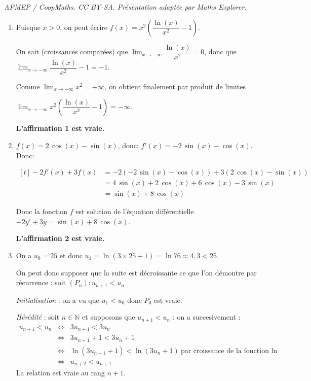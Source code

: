 \documentclass[10pt]{article}
\providecommand{\N}{\mathbb{N}}
\begin{document}
\noindent\textit{APMEP / CoopMaths. CC BY-SA. Présentation adaptée par Maths Explorer.}\par\medskip
\smallskip

\begin{enumerate}
\item Puisque $x > 0$, on peut écrire $f(x) = x^2\left(\dfrac{\ln (x)}{x^2}  - 1\right)$.

On sait (croissances comparées) que $\displaystyle\lim_{x \to - \infty} \dfrac{\ln (x)}{x^2} = 0$, donc que $\displaystyle\lim_{x \to - \infty} \dfrac{\ln (x)}{x^2} - 1 = - 1$.

Comme $\displaystyle\lim_{x \to - \infty}x^2 = + \infty$, on obtient finalement par produit de limites 

$\displaystyle\lim_{x \to - \infty} x^2 \left(\dfrac{\ln (x)}{x^2}  - 1\right) = - \infty$.

\hfill\textbf{L'affirmation 1 est vraie.}

\item $f(x)=2\,\cos\left (x\right )- \sin\left (x\right )$, donc:
$f'(x)= -2\,\sin\left (x\right ) - \cos\left (x\right )$. Donc:

$\begin{aligned}[t]
- 2f'(x) + 3f(x) 
& = -2\left ( -2\,\sin\left (x\right ) - \cos\left (x\right )\right ) +3 \left (2\,\cos\left (x\right )- \sin\left (x\right ) \right )\\
& = 4\,\sin\left (x\right ) +2\,\cos\left (x\right ) +6\,\cos\left (x\right ) -3\,\sin\left (x\right )\\
 & = \sin\left (x\right ) +8\,\cos\left (x\right )
\end{aligned}$

Donc la fonction $f$ est solution de l'équation différentielle $-2y' +3y =  \sin\left (x\right ) +8\,\cos\left (x\right )$.

\hfill\textbf{L'affirmation 2 est vraie.}

\item On a $u_0 = 25$ et donc $u_1 = \ln (3 \times 25 + 1) = \ln 76 \approx 4,3 < 25$.

On peut donc supposer que la suite est décroissante ce que l'on démontre par récurrence : soit $(P_n) : u_{n+1} < u_n$

\textit{Initialisation} : on a vu que $u_1 < u_0$ donc $P_0$ est vraie.

\textit{Hérédité} : soit $n \in \N$ et supposons que $u_{n+1} < u_n$ : on a succesivement :
\begin{eqnarray*}
u_{n+1} < u_n &\iff & 3u_{n+1} < 3u_n\\
&\iff &3u_{n+1} + 1 < 3u_n + 1\\
&\iff &\ln \left(3u_{n+1} + 1\right) < \ln \left(3u_n + 1\right)\:\text{par croissance de la fonction ln}\\
&\iff &u_{n+2} < u_{n+1}
\end{eqnarray*}
La relation est vraie au rang $n+1$.


\end{enumerate}
\end{document}
